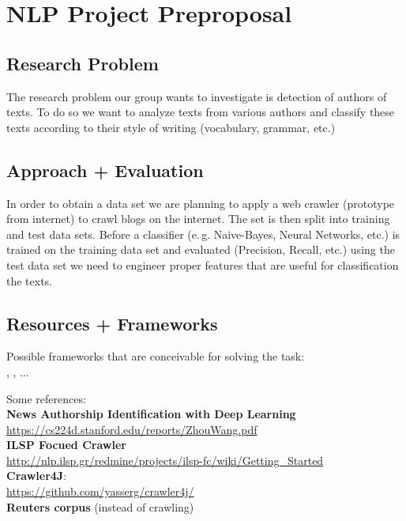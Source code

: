 \documentclass{scrartcl}
\begin{document}
\enlargethispage{4\baselineskip}
\section{NLP Project Preproposal}

\vspace*{-3mm}
\subsection{Research Problem}
\vspace*{-3mm}
The research problem our group wants to investigate is detection of authors of texts. To do so we want to analyze texts from various authors and classify these texts according to their style of writing (vocabulary, grammar, etc.)

\vspace*{-3mm}
\subsection{Approach + Evaluation}
\vspace*{-3mm}
In order to obtain a data set we are planning to apply a web crawler (prototype from internet) to crawl blogs on the internet. The set is then split into training and test data sets. Before a classifier (e.\,g. Naive-Bayes, Neural Networks, etc.) is trained on the training data set and evaluated (Precision, Recall, etc.) using the test data set we need to engineer proper features that are useful for classification the texts.

\vspace*{-3mm}
\subsection{Resources + Frameworks}
\vspace*{-3mm}
Possible frameworks that are conceivable for solving the task: \\
, , $\dots$

Some references: \\
\textbf{News Authorship Identification with Deep Learning} \\
\url{https://cs224d.stanford.edu/reports/ZhouWang.pdf} \\
\textbf{ILSP Focued Crawler} \\
\url{http://nlp.ilsp.gr/redmine/projects/ilsp-fc/wiki/Getting_Started} \\
\textbf{Crawler4J}: \\
\url{https://github.com/yasserg/crawler4j/} \\
\textbf{Reuters corpus} (instead of crawling)
\end{document}
